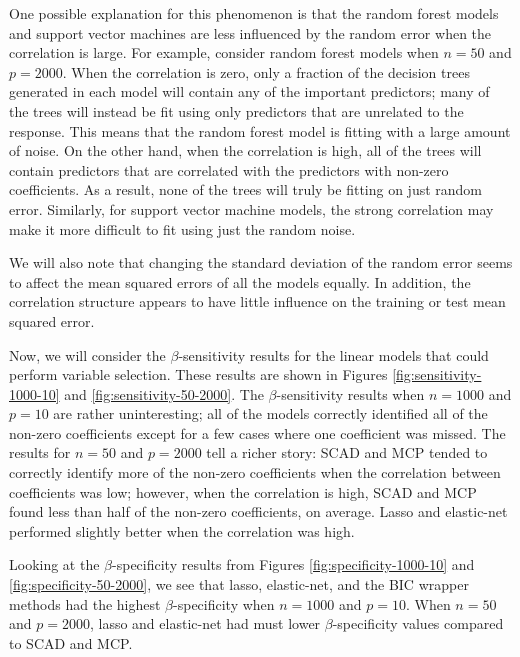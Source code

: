 \documentclass{article}
\begin{document}
One possible explanation for this phenomenon is that the random forest models and support vector machines are less influenced by the random error when the correlation is large. For example, consider random forest models when $n = 50$ and $p = 2000$. When the correlation is zero, only a fraction of the decision trees generated in each model will contain any of the important predictors; many of the trees will instead be fit using only predictors that are unrelated to the response. This means that the random forest model is fitting with a large amount of noise. On the other hand, when the correlation is high, all of the trees will contain predictors that are correlated with the  predictors with non-zero coefficients. As a result, none of the trees will truly be fitting on just random error. Similarly, for support vector machine models, the strong correlation may make it more difficult to fit using just the random noise.

We will also note that changing the standard deviation of the random error seems to affect the mean squared errors of all the models equally. In addition, the correlation structure appears to have little influence on the training or test mean squared error.

Now, we will consider the $\beta$-sensitivity results for the linear models that could perform variable selection. These results are shown in Figures \ref{fig:sensitivity-1000-10} and \ref{fig:sensitivity-50-2000}. The $\beta$-sensitivity results when $n = 1000$ and $p = 10$ are rather uninteresting; all of the models correctly identified all of the non-zero coefficients except for a few cases where one coefficient was missed. The results for $n = 50$ and $p = 2000$ tell a richer story: SCAD and MCP tended to correctly identify more of the non-zero coefficients when the correlation between coefficients was low; however, when the correlation is high, SCAD and MCP found less than half of the non-zero coefficients, on average. Lasso and elastic-net performed slightly better when the correlation was high.

Looking at the $\beta$-specificity results from Figures \ref{fig:specificity-1000-10} and \ref{fig:specificity-50-2000}, we see that lasso, elastic-net, and the BIC wrapper methods had the highest $\beta$-specificity when $n = 1000$ and $p = 10$. When $n = 50$ and $p = 2000$, lasso and elastic-net had must lower $\beta$-specificity values compared to SCAD and MCP.
\end{document}
